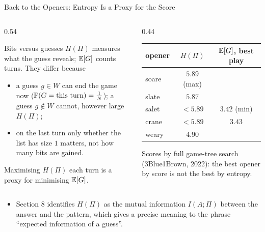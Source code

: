 \begin{frame}{Back to the Openers: Entropy Is a Proxy for the Score}
  \small
  \begin{columns}[T]
    \begin{column}{0.54\textwidth}
      \begin{block}{Bits versus guesses}
        $H(\Pi)$ measures what the guess reveals; $\mathbb{E}[G]$ counts turns. They differ because
        \begin{itemize}
          \item a guess $g\in W$ can end the game now ($\mathbb{P}(G=\text{this turn})=\tfrac1N$); a guess $g\notin W$ cannot, however large $H(\Pi)$;
          \item on the last turn only whether the list has size $1$ matters, not how many bits are gained.
        \end{itemize}
        Maximising $H(\Pi)$ each turn is a proxy for minimising $\mathbb{E}[G]$.
      \end{block}
    \end{column}
    \begin{column}{0.44\textwidth}
      \centering
      \renewcommand{\arraystretch}{1.2}
      \begin{tabular}{@{}lcc@{}}
        \toprule
        opener & $H(\Pi)$ & $\mathbb{E}[G]$, best play \\
        \midrule
        \textsf{soare} & $5.89$ (max) & \\
        \textsf{slate} & $5.87$ & \\
        \textsf{salet} & $<5.89$ & $3.42$ (min) \\
        \textsf{crane} & $<5.89$ & $3.43$ \\
        \textsf{weary} & $4.90$ & \\
        \bottomrule
      \end{tabular}
      \par\smallskip
      {\footnotesize Scores by full game-tree search (3Blue1Brown, 2022): the best opener by score is not the best by entropy.}
    \end{column}
  \end{columns}
  \begin{itemize}
    \item Section 8 identifies $H(\Pi)$ as the mutual information $I(A;\Pi)$ between the answer and the pattern, which gives a precise meaning to the phrase ``expected information of a guess''.
  \end{itemize}
\end{frame}

